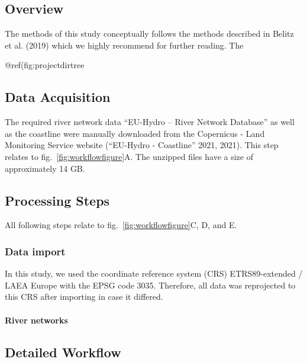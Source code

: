\documentclass[fleqn,10pt]{wlscirep}
\begin{document}
\hypertarget{overview}{%
\subsection{Overview}\label{overview}}

The methods of this study conceptually follows the methods described in Belitz et al. (2019) which we highly recommend for further reading. The

@ref(fig:projectdirtree

\hypertarget{data-acquisition}{%
\subsection{Data Acquisition}\label{data-acquisition}}

The required river network data ``EU-Hydro -- River Network Database'' as well as the coastline were manually downloaded from the Copernicus - Land Monitoring Service website ({``{EU}-{Hydro} - {Coastline}''} 2021, 2021). This step relates to fig.~\ref{fig:workflowfigure}A. The unzipped files have a size of approximately 14 GB.

\hypertarget{processing-steps}{%
\subsection{Processing Steps}\label{processing-steps}}

All following steps relate to fig.~\ref{fig:workflowfigure}C, D, and E.

\hypertarget{data-import}{%
\subsubsection{Data import}\label{data-import}}

In this study, we used the coordinate reference system (CRS) ETRS89-extended / LAEA Europe with the EPSG code 3035. Therefore, all data was reprojected to this CRS after importing in case it differed.

\hypertarget{river-networks}{%
\paragraph{River networks}\label{river-networks}}

\hypertarget{detailed-workflow}{%
\subsection*{Detailed Workflow}\label{detailed-workflow}}
\end{document}
